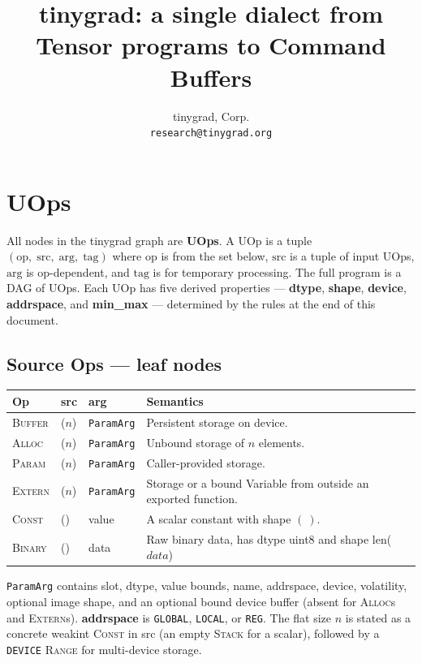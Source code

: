 \documentclass[10pt,letterpaper]{article}
\title{tinygrad: a single dialect from Tensor programs to Command Buffers}
\author{tinygrad, Corp. \\ \texttt{research@tinygrad.org}}
\date{}
\newcommand{\op}[1]{\textsc{#1}}
\begin{document}
\maketitle
\thispagestyle{empty}

\section*{UOps}

All nodes in the tinygrad graph are \textbf{UOps}. A UOp is a tuple $(\mathrm{op},\;\mathrm{src},\;\mathrm{arg},\;\mathrm{tag})$ where $\mathrm{op}$ is from the set below, $\mathrm{src}$ is a tuple of input UOps, $\mathrm{arg}$ is op-dependent, and $\mathrm{tag}$ is for temporary processing. The full program is a DAG of UOps. Each UOp has five derived properties --- \textbf{dtype}, \textbf{shape}, \textbf{device}, \textbf{addrspace}, and \textbf{min\_max} --- determined by the rules at the end of this document.

\subsection*{Source Ops \normalfont\small--- leaf nodes}

\begin{tabular}{@{}l l l l@{}}
\toprule
\textbf{Op} & \textbf{src} & \textbf{arg} & \textbf{Semantics} \\
\midrule
\op{Buffer} & ($n$) & \texttt{ParamArg} &
  Persistent storage on device. \\
\op{Alloc} & ($n$) & \texttt{ParamArg} &
  Unbound storage of $n$ elements. \\
\op{Param} & ($n$) & \texttt{ParamArg} &
  Caller-provided storage. \\
\op{Extern} & ($n$) & \texttt{ParamArg} &
  Storage or a bound Variable from outside an exported function. \\
\op{Const} & () & value &
  A scalar constant with shape $(\ )$. \\
\op{Binary} & () & data & Raw binary data, has dtype uint8 and shape len($data$)  \\
\bottomrule
\end{tabular}

\smallskip
\texttt{ParamArg} contains slot, dtype, value bounds, name, addrspace, device, volatility, optional image shape, and an optional bound device buffer (absent for \op{Alloc}s and \op{Extern}s). \textbf{addrspace} is \texttt{GLOBAL}, \texttt{LOCAL}, or \texttt{REG}. The flat size $n$ is stated as a concrete weakint \op{Const} in src (an empty \op{Stack} for a scalar), followed by a \texttt{DEVICE} \op{Range} for multi-device storage.
\end{document}

